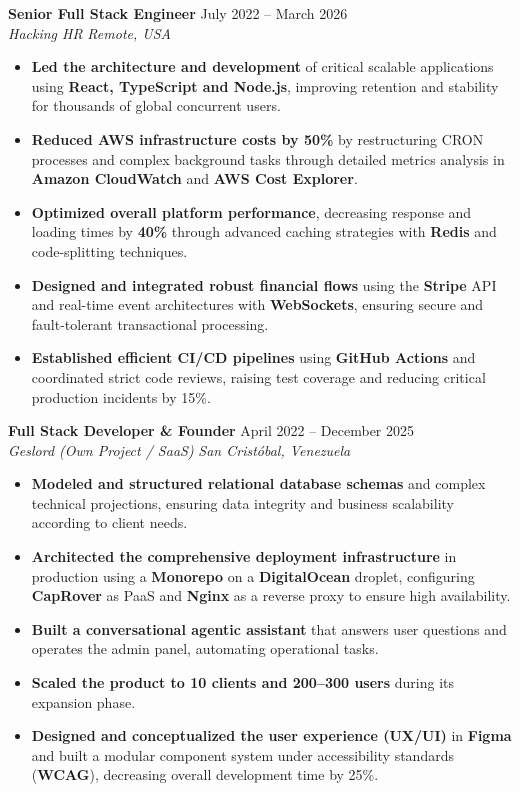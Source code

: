 \documentclass[11pt]{article}
\begin{document}
\textbf{Senior Full Stack Engineer} \hfill July 2022 – March 2026 \\
\textit{Hacking HR} \hfill \textit{Remote, USA}
\begin{itemize}[noitemsep, topsep=1pt, leftmargin=15pt]
    \item \textbf{Led the architecture and development} of critical scalable applications using \textbf{React, TypeScript and Node.js}, improving retention and stability for thousands of global concurrent users.
    \item \textbf{Reduced AWS infrastructure costs by 50\%} by restructuring CRON processes and complex background tasks through detailed metrics analysis in \textbf{Amazon CloudWatch} and \textbf{AWS Cost Explorer}.
    \item \textbf{Optimized overall platform performance}, decreasing response and loading times by \textbf{40\%} through advanced caching strategies with \textbf{Redis} and code-splitting techniques.
    \item \textbf{Designed and integrated robust financial flows} using the \textbf{Stripe} API and real-time event architectures with \textbf{WebSockets}, ensuring secure and fault-tolerant transactional processing.
    \item \textbf{Established efficient CI/CD pipelines} using \textbf{GitHub Actions} and coordinated strict code reviews, raising test coverage and reducing critical production incidents by 15\%.
\end{itemize}

\vspace{4pt}

\textbf{Full Stack Developer \& Founder} \hfill April 2022 – December 2025 \\
\textit{Geslord (Own Project / SaaS)} \hfill \textit{San Cristóbal, Venezuela}
\begin{itemize}[noitemsep, topsep=1pt, leftmargin=15pt]
    \item \textbf{Modeled and structured relational database schemas} and complex technical projections, ensuring data integrity and business scalability according to client needs.
    \item \textbf{Architected the comprehensive deployment infrastructure} in production using a \textbf{Monorepo} on a \textbf{DigitalOcean} droplet, configuring \textbf{CapRover} as PaaS and \textbf{Nginx} as a reverse proxy to ensure high availability.
    \item \textbf{Built a conversational agentic assistant} that answers user questions and operates the admin panel, automating operational tasks.
    \item \textbf{Scaled the product to 10 clients and 200–300 users} during its expansion phase.
    \item \textbf{Designed and conceptualized the user experience (UX/UI)} in \textbf{Figma} and built a modular component system under accessibility standards (\textbf{WCAG}), decreasing overall development time by 25\%.
\end{itemize}
\end{document}
